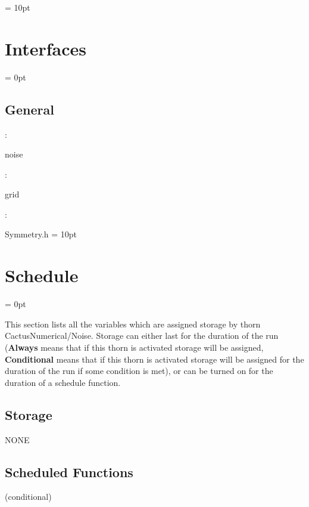 \documentclass{article}
\begin{document}
\vspace{0.5cm}\parskip = 10pt 

\section{Interfaces} 


\parskip = 0pt

\vspace{3mm} \subsection*{General}

: 

noise
\vspace{2mm}

: 

grid
\vspace{2mm}

\vspace{5mm}

: 

Symmetry.h
\vspace{2mm}\parskip = 10pt 

\section{Schedule} 


\parskip = 0pt


\noindent This section lists all the variables which are assigned storage by thorn CactusNumerical/Noise.  Storage can either last for the duration of the run ({\bf Always} means that if this thorn is activated storage will be assigned, {\bf Conditional} means that if this thorn is activated storage will be assigned for the duration of the run if some condition is met), or can be turned on for the duration of a schedule function.


\subsection*{Storage}NONE
\subsection*{Scheduled Functions}
\vspace{5mm}

   (conditional) 
\end{document}
